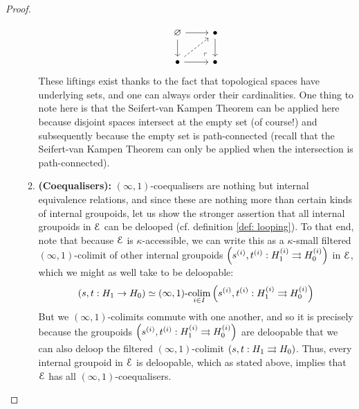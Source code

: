 \begin{proof}
\begin{enumerate}
\begin{enumerate}
$$\begin{tikzcd}
                                            	\varnothing & \bullet \\
                                            	\bullet & \bullet
                                            	\arrow[from=1-1, to=2-1]
                                            	\arrow[from=2-1, to=2-2]
                                            	\arrow[from=1-1, to=1-2]
                                            	\arrow[from=1-2, to=2-2]
                                            	\arrow[dashed, from=2-1, to=1-2]
                                            	\arrow["\lrcorner"{anchor=center, pos=0.125, rotate=180}, draw=none, from=2-2, to=1-1]
                                            \end{tikzcd}
                                        $$
                                    These liftings exist thanks to the fact that topological spaces have underlying sets, and one can always order their cardinalities. One thing to note here is that the Seifert-van Kampen Theorem can be applied here because disjoint spaces intersect at the empty set (of course!) and subsequently because the empty set is path-connected (recall that the Seifert-van Kampen Theorem can only be applied when the intersection is path-connected).
                                    \item \textbf{(Coequalisers):} $(\infty, 1)$-coequalisers are nothing but internal equivalence relations, and since these are nothing more than certain kinds of internal groupoids, let us show the stronger assertion that all internal groupoids in $\mathcal{E}$ can be delooped (cf. definition \ref{def: looping}). To that end, note that because $\mathcal{E}$ is $\kappa$-accessible, we can write this as a $\kappa$-small filtered $(\infty, 1)$-colimit of other internal groupoids $\left( s^{(i)}, t^{(i)}: H_1^{(i)} \rightrightarrows H_0^{(i)} \right)$ in $\mathcal{E}$, which we might as well take to be deloopable:
                                        $$(s, t: H_1 \to H_0) \simeq (\infty, 1)\text{-}\underset{i \in I}{\operatorname{colim}} \left( s^{(i)}, t^{(i)}: H_1^{(i)} \rightrightarrows H_0^{(i)} \right)$$
                                    But we $(\infty, 1)$-colimits commute with one another, and so it is precisely because the groupoids $\left( s^{(i)}, t^{(i)}: H_1^{(i)} \rightrightarrows H_0^{(i)} \right)$ are deloopable that we can also deloop the filtered $(\infty, 1)$-colimit $(s, t: H_1 \rightrightarrows H_0)$. Thus, every internal groupoid in $\mathcal{E}$ is deloopable, which as stated above, implies that $\mathcal{E}$ has all $(\infty, 1)$-coequalisers.
                                \end{enumerate}

\end{enumerate}
\end{proof}
